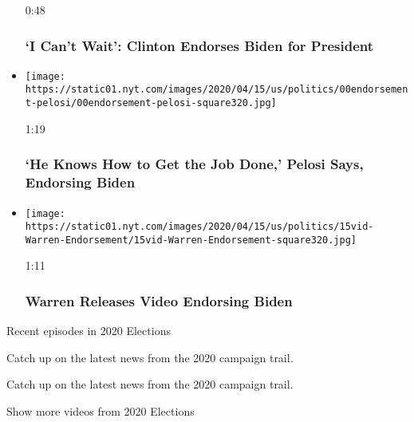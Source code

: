 \begin{itemize}
  0:48

  \hypertarget{i-cant-wait-clinton-endorses-biden-for-president}{%
  \subsubsection{`I Can't Wait': Clinton Endorses Biden for
  President}\label{i-cant-wait-clinton-endorses-biden-for-president}}
\item
  \href{https://www.nytimes.com/video/us/politics/100000007109631/pelosi-endorses-biden.html?action=click\&module=video-series-bar\&region=header\&pgtype=Article\&playlistId=video/2020-Elections}{}

  \texttt{[image: https://static01.nyt.com/images/2020/04/15/us/politics/00endorsement-pelosi/00endorsement-pelosi-square320.jpg]}

  1:19

  \hypertarget{he-knows-how-to-get-the-job-done-pelosi-says-endorsing-biden}{%
  \subsubsection{`He Knows How to Get the Job Done,' Pelosi Says,
  Endorsing
  Biden}\label{he-knows-how-to-get-the-job-done-pelosi-says-endorsing-biden}}
\item
  \href{https://www.nytimes.com/video/us/politics/100000007089056/warren-releases-video-endorsing-biden.html?action=click\&module=video-series-bar\&region=header\&pgtype=Article\&playlistId=video/2020-Elections}{}

  \texttt{[image: https://static01.nyt.com/images/2020/04/15/us/politics/15vid-Warren-Endorsement/15vid-Warren-Endorsement-square320.jpg]}

  1:11

  \hypertarget{warren-releases-video-endorsing-biden}{%
  \subsubsection{Warren Releases Video Endorsing
  Biden}\label{warren-releases-video-endorsing-biden}}
\end{itemize}

Recent episodes in 2020 Elections

Catch up on the latest news from the 2020 campaign trail.

Catch up on the latest news from the 2020 campaign trail.

Show more videos from 2020 Elections


